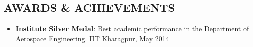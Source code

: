 \documentclass{res}
\begin{document}
\begin{resume}
	
	
	
	
	
		
	
	\section{\MakeUppercase{Awards \& Achievements}} \vskip 0.35in
	\begin{itemize}[leftmargin=\parindent]
	\setlength{\itemsep}{0mm}
	
		\item[] {\bf Institute Silver Medal}:  Best academic performance in the Department of Aerospace Engineering. IIT Kharagpur, May 2014
	\end{itemize}
	
	
	\end{resume}
	
\end{document}
